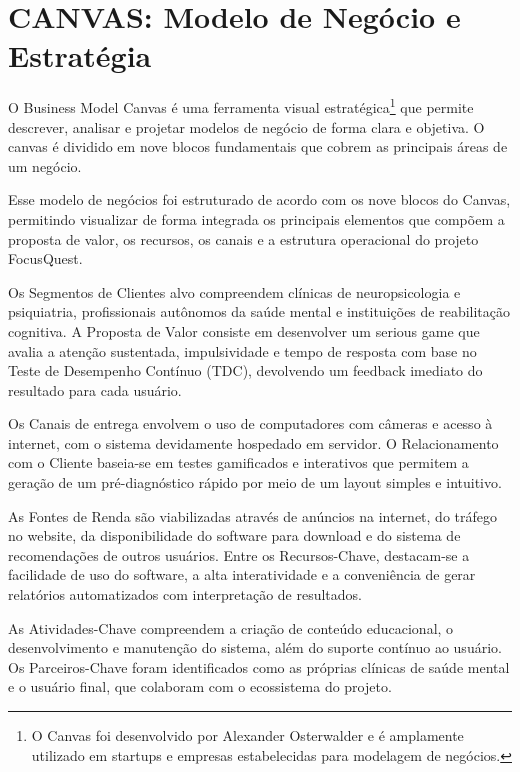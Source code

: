 \documentclass[11pt,a4paper]{article}
\begin{document}
\pagestyle{fancy}

\tableofcontents
\newpage

\section{CANVAS: Modelo de Negócio e Estratégia}

O Business Model Canvas \cite{santos2024} é uma ferramenta visual estratégica\footnote{O Canvas foi desenvolvido por Alexander Osterwalder e é amplamente utilizado em startups e empresas estabelecidas para modelagem de negócios.} que permite descrever, analisar e projetar modelos de negócio de forma clara e objetiva. O canvas é dividido em nove blocos fundamentais que cobrem as principais áreas de um negócio.

Esse modelo de negócios foi estruturado de acordo com os nove blocos do Canvas, permitindo visualizar de forma integrada os principais elementos que compõem a proposta de valor, os recursos, os canais e a estrutura operacional do projeto FocusQuest.

Os Segmentos de Clientes alvo compreendem clínicas de neuropsicologia e psiquiatria, profissionais autônomos da saúde mental e instituições de reabilitação cognitiva. A Proposta de Valor consiste em desenvolver um serious game que avalia a atenção sustentada, impulsividade e tempo de resposta com base no Teste de Desempenho Contínuo (TDC), devolvendo um feedback imediato do resultado para cada usuário.

Os Canais de entrega envolvem o uso de computadores com câmeras e acesso à internet, com o sistema devidamente hospedado em servidor. O Relacionamento com o Cliente baseia-se em testes gamificados e interativos que permitem a geração de um pré-diagnóstico rápido por meio de um layout simples e intuitivo.

As Fontes de Renda são viabilizadas através de anúncios na internet, do tráfego no website, da disponibilidade do software para download e do sistema de recomendações de outros usuários. Entre os Recursos-Chave, destacam-se a facilidade de uso do software, a alta interatividade e a conveniência de gerar relatórios automatizados com interpretação de resultados.

As Atividades-Chave compreendem a criação de conteúdo educacional, o desenvolvimento e manutenção do sistema, além do suporte contínuo ao usuário. Os Parceiros-Chave foram identificados como as próprias clínicas de saúde mental e o usuário final, que colaboram com o ecossistema do projeto.
\end{document}
